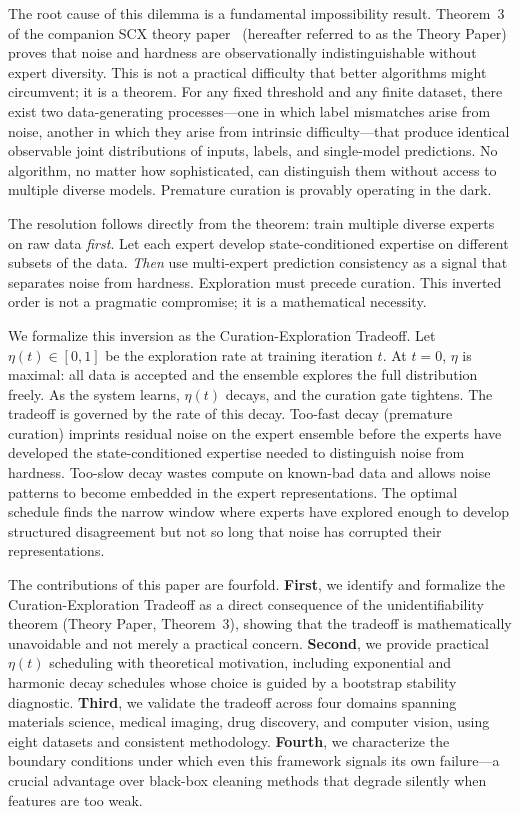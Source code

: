 \documentclass{article}
\begin{document}
The root cause of this dilemma is a fundamental impossibility result. Theorem~3 of the companion SCX theory paper~\cite{scx2025theory} (hereafter referred to as the Theory Paper) proves that noise and hardness are observationally indistinguishable without expert diversity. This is not a practical difficulty that better algorithms might circumvent; it is a theorem. For any fixed threshold and any finite dataset, there exist two data-generating processes---one in which label mismatches arise from noise, another in which they arise from intrinsic difficulty---that produce identical observable joint distributions of inputs, labels, and single-model predictions. No algorithm, no matter how sophisticated, can distinguish them without access to multiple diverse models. Premature curation is provably operating in the dark.

The resolution follows directly from the theorem: train multiple diverse experts on raw data \emph{first}. Let each expert develop state-conditioned expertise on different subsets of the data. \emph{Then} use multi-expert prediction consistency as a signal that separates noise from hardness. Exploration must precede curation. This inverted order is not a pragmatic compromise; it is a mathematical necessity.

We formalize this inversion as the Curation-Exploration Tradeoff. Let $\eta(t) \in [0,1]$ be the exploration rate at training iteration $t$. At $t = 0$, $\eta$ is maximal: all data is accepted and the ensemble explores the full distribution freely. As the system learns, $\eta(t)$ decays, and the curation gate tightens. The tradeoff is governed by the rate of this decay. Too-fast decay (premature curation) imprints residual noise on the expert ensemble before the experts have developed the state-conditioned expertise needed to distinguish noise from hardness. Too-slow decay wastes compute on known-bad data and allows noise patterns to become embedded in the expert representations. The optimal schedule finds the narrow window where experts have explored enough to develop structured disagreement but not so long that noise has corrupted their representations.

The contributions of this paper are fourfold. \textbf{First}, we identify and formalize the Curation-Exploration Tradeoff as a direct consequence of the unidentifiability theorem (Theory Paper, Theorem~3), showing that the tradeoff is mathematically unavoidable and not merely a practical concern. \textbf{Second}, we provide practical $\eta(t)$ scheduling with theoretical motivation, including exponential and harmonic decay schedules whose choice is guided by a bootstrap stability diagnostic. \textbf{Third}, we validate the tradeoff across four domains spanning materials science, medical imaging, drug discovery, and computer vision, using eight datasets and consistent methodology. \textbf{Fourth}, we characterize the boundary conditions under which even this framework signals its own failure---a crucial advantage over black-box cleaning methods that degrade silently when features are too weak.
\end{document}
